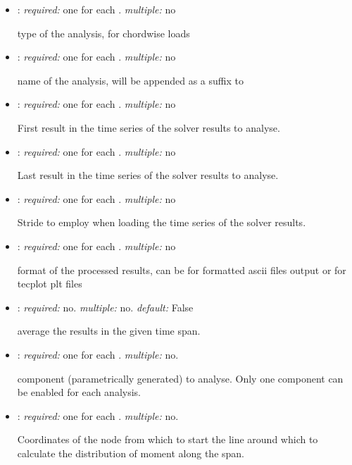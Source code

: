 \begin{itemize}
\item {}: \textit{required:} one for each . \textit{multiple:} no

type of the analysis,  for chordwise loads

\item {}: \textit{required:} one for each . \textit{multiple:} no

name of the analysis, will be appended as a suffix to 

\item {}: \textit{required:} one for each . 
\textit{multiple:} no

First result in the time series of the solver results to analyse.

\item {}: \textit{required:} one for each . 
\textit{multiple:} no

Last result in the time series of the solver results to analyse.

\item {}: \textit{required:} one for each . 
\textit{multiple:} no

Stride to employ when loading the time series of the solver results. 

\item {}: \textit{required:} one for each . 
\textit{multiple:} no

format of the processed results, can be  for formatted ascii files 
output or  for tecplot plt files

\item {}: \textit{required:} no. \textit{multiple:} no. 
\textit{default:} False

average the results in the given time span.

\item {}: \textit{required:} one for each . 
\textit{multiple:} no.

component (parametrically generated) to analyse. Only one component can be 
enabled for each analysis. 

\item {}: \textit{required:} one for each . 
\textit{multiple:} no.

Coordinates of the node from which to start the line around which to calculate 
the distribution of moment along the span.


\end{itemize}
